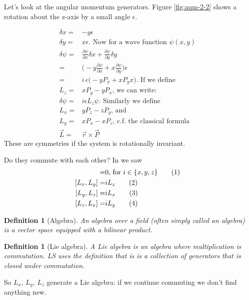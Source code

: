 \documentclass[]{article}
\newcommand\numberthis{\addtocounter{equation}{1}\tag{\theequation}}
\newtheorem{defn}[thm]{Definition}
\begin{document}
Let's look at the angular momentum generators. Figure \ref{fig:aqm-2-2} shows a  rotation about the z-axis by a small angle $\epsilon$.

\begin{align*}
	\delta x =& - y \epsilon\\
	\delta y =& x \epsilon \text{. Now for a wave function $\psi(x,y)$}\\
	\delta \psi =& \frac{\partial \psi}{\partial x} \delta x + \frac{\partial \psi}{\partial y} \delta y\\
	=&\big( - y \frac{\partial \psi}{\partial x} + x \frac{\partial \psi}{\partial y}\big) \epsilon\\
	=& i \, \epsilon \big(- y P_x + x P_y x\big)  \text{. If we define}\\
	L_z =& x P_y - y P_x \text{, we can write:}\\
	\delta \psi=& i \epsilon L_z \psi\text{. Similarly we define}\\
	L_x =& y P_z - z P_y \text{, and}\\
	L_y =& x P_x - x P_z \text{, c.f. the classical formula}\\
	\vec{L} =& \vec{r} \times \vec{P}
\end{align*}
These are symmetries if the system is rotationally invariant.

Do they commute with each other? In \cite{susskind2014quantum} we saw
\begin{align*}
	[L_i,H]=& 0 \text{, for $i \in \{x,y,z\}$}\numberthis \label{eq:LH}\\
	[L_x,L_y] =& i L_z \numberthis \label{eq:lx_ly}\\
	[L_y,L_z] =& i L_x\numberthis \label{eq:ly_lz}\\
	[L_z,L_x] =& i L_y\numberthis \label{eq:lz_lx}
\end{align*}

\begin{defn}[Algebra]
	An \emph{algebra over a field } (often simply called an algebra) is a vector space equipped with a bilinear product. 
\end{defn}

\begin{defn}[Lie algebra]
	A Lie algebra is an algebra where multiplication is commutation. LS uses the definition that is is a collection of generators that is closed under commutation.
\end{defn}

So $L_x$, $L_y$, $L_z$ generate a Lie algebra: if we continue commuting we don't find anything new.
\end{document}
